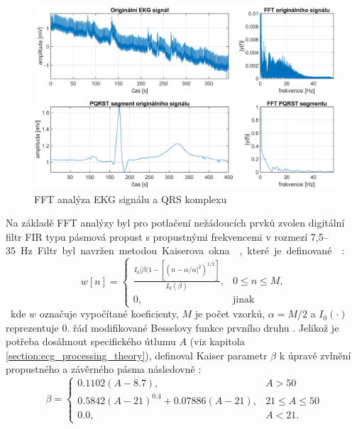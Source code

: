 \begin{figure}[h]
    \begin{center}
        \includegraphics[width=1\textwidth]{../assets/figures/spectral_analysis}
        \caption{FFT analýza EKG signálu a QRS komplexu}
        \label{fig:spectral_analysis}
    \end{center}
\end{figure}

Na základě FFT analýzy byl pro potlačení nežádoucích prvků zvolen digitální
filtr FIR typu pásmová propust s propustnými frekvencemi v rozmezí
7,5--35~\si\Hz. Filtr byl navržen metodou Kaiserova okna \cite{Chavan2006},
které je definované \cite{Oppenheim1999}:
\begin{equation}
    \label{eq:kaiser1}
    w[n] =
    \begin{cases}
        \frac{I_0[\beta(1-[(n-\alpha/\alpha]^2)^{1/2}]}{I_0(\beta)}, & 0 \leq n \leq M, \\
        0,                                                           & \text{jinak}
    \end{cases}
\end{equation}
kde $w$ označuje vypočítané koeficienty, $M$ je počet vzorků, $\alpha=M/2$ a
$I_0(\cdot)$ reprezentuje 0. řád modifikované Besselovy funkce prvního druhu
\cite{BesselFcn}. Jelikož je potřeba dosáhnout specifického útlumu $A$ (viz
kapitola \ref{section:ecg_processing_theory}), definoval Kaiser parametr $\beta$
k úpravě zvlnění propustného a závěrného pásma následovně \cite{Oppenheim1999}:
\begin{equation}
    \beta =
    \begin{cases}
        0.1102(A-8.7),                    & A > 50            \\
        0.5842(A-21)^0.4 + 0.07886(A-21), & 21 \leq A \leq 50 \\
        0.0,                              & A < 21.
    \end{cases}
\end{equation}

